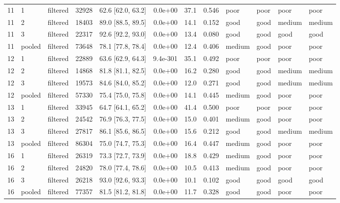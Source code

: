 \begin{longtable}{lllrrrrrllll}
11 & 1 & filtered & 32928 & 62.6 [62.0, 63.2] & 0.0e+00 & 37.1 & 0.546 & poor & poor & poor & poor \\
11 & 2 & filtered & 18403 & 89.0 [88.5, 89.5] & 0.0e+00 & 14.1 & 0.152 & good & good & medium & medium \\
11 & 3 & filtered & 22317 & 92.6 [92.2, 93.0] & 0.0e+00 & 13.4 & 0.080 & good & good & good & good \\
11 & pooled & filtered & 73648 & 78.1 [77.8, 78.4] & 0.0e+00 & 12.4 & 0.406 & medium & good & poor & poor \\
12 & 1 & filtered & 22889 & 63.6 [62.9, 64.3] & 9.4e-301 & 35.1 & 0.492 & poor & poor & poor & poor \\
12 & 2 & filtered & 14868 & 81.8 [81.1, 82.5] & 0.0e+00 & 16.2 & 0.280 & good & good & medium & medium \\
12 & 3 & filtered & 19573 & 84.6 [84.0, 85.2] & 0.0e+00 & 12.0 & 0.271 & good & good & medium & medium \\
12 & pooled & filtered & 57330 & 75.4 [75.0, 75.8] & 0.0e+00 & 14.1 & 0.445 & medium & good & poor & poor \\
13 & 1 & filtered & 33945 & 64.7 [64.1, 65.2] & 0.0e+00 & 41.4 & 0.500 & poor & poor & poor & poor \\
13 & 2 & filtered & 24542 & 76.9 [76.3, 77.5] & 0.0e+00 & 15.0 & 0.401 & medium & good & poor & poor \\
13 & 3 & filtered & 27817 & 86.1 [85.6, 86.5] & 0.0e+00 & 15.6 & 0.212 & good & good & medium & medium \\
13 & pooled & filtered & 86304 & 75.0 [74.7, 75.3] & 0.0e+00 & 16.4 & 0.447 & medium & good & poor & poor \\
16 & 1 & filtered & 26319 & 73.3 [72.7, 73.9] & 0.0e+00 & 18.8 & 0.429 & medium & good & poor & poor \\
16 & 2 & filtered & 24820 & 78.0 [77.4, 78.6] & 0.0e+00 & 10.5 & 0.413 & medium & good & poor & poor \\
16 & 3 & filtered & 26218 & 93.0 [92.6, 93.3] & 0.0e+00 & 10.1 & 0.102 & good & good & good & good \\
16 & pooled & filtered & 77357 & 81.5 [81.2, 81.8] & 0.0e+00 & 11.7 & 0.328 & good & good & poor & poor \\
\end{longtable}
